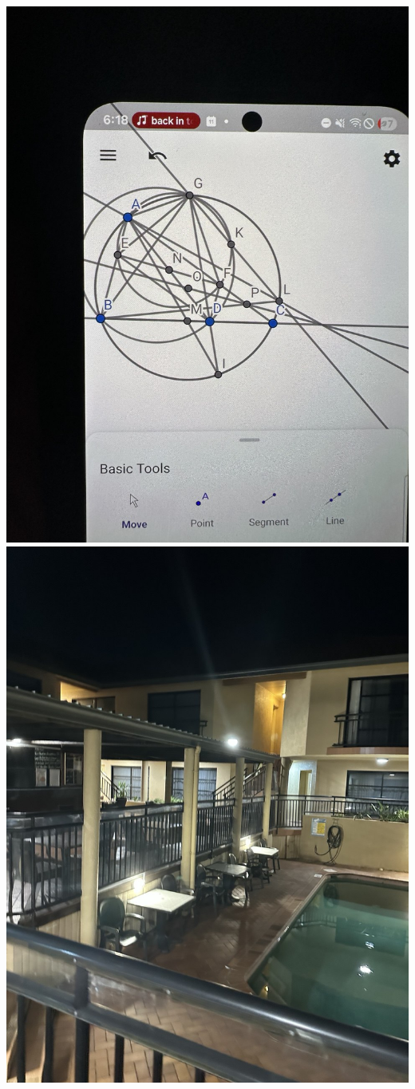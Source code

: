 \documentclass{article}
\begin{document}
\begin{center}
  \includegraphics[scale=0.15]{assets/geo-in-airplane.jpg}
\includegraphics[scale=0.15]{assets/hotel-australia.jpg}

\end{center}
\end{document}
